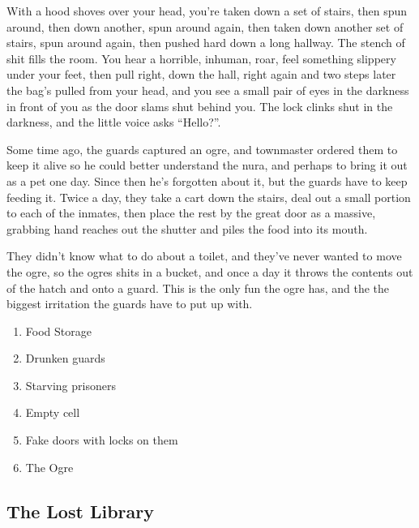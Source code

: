 \begin{boxtext}
	With a hood shoves over your head, you're taken down a set of stairs, then spun around, then down another, spun around again, then taken down another set of stairs, spun around again, then pushed hard down a long hallway.  The stench of shit fills the room.  You hear a horrible, inhuman, roar, feel something slippery under your feet, then pull right, down the hall, right again and two steps later the bag's pulled from your head, and you see a small pair of eyes in the darkness in front of you as the door slams shut behind you.  The lock clinks shut in the darkness, and the little voice asks ``Hello?''.
\end{boxtext}

Some time ago, the guards captured an ogre, and \gls{townmaster} ordered them to keep it alive so he could better understand the nura, and perhaps to bring it out as a pet one day.  Since then he's forgotten about it, but the guards have to keep feeding it.  Twice a day, they take a cart down the stairs, deal out a small portion to each of the inmates, then place the rest by the great door as a massive, grabbing hand reaches out the shutter and piles the food into its mouth.

They didn't know what to do about a toilet, and they've never wanted to move the ogre, so the ogres shits in a bucket, and once a day it throws the contents out of the hatch and onto a guard.  This is the only fun the ogre has, and the the biggest irritation the guards have to put up with.


\begin{enumerate}

	\item{Food Storage}
	\item{Drunken guards}
	\item{Starving prisoners}
	\item{Empty cell}
	\item{Fake doors with locks on them}
	\item{The Ogre}

\end{enumerate}




\subsection{\hspace{4.5cm}The Lost Library}\label{sewers}\setcounter{list}{0}

